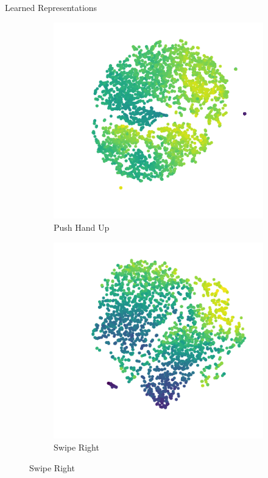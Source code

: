 \documentclass{beamer}
\begin{document}
\begin{frame}{Learned Representations}
  \begin{figure}
    \centering
    \begin{subfigure}{0.49\textwidth}
      \centering
      \includegraphics[width=\textwidth]{figures/push-hand-up}
      \caption{Push Hand Up}
    \end{subfigure}
    \begin{subfigure}{0.49\textwidth}
      \centering
      \includegraphics[width=\textwidth]{figures/swipe-right}
      \caption{Swipe Right}
    \end{subfigure}
  \end{figure}
\end{frame}
\end{document}
